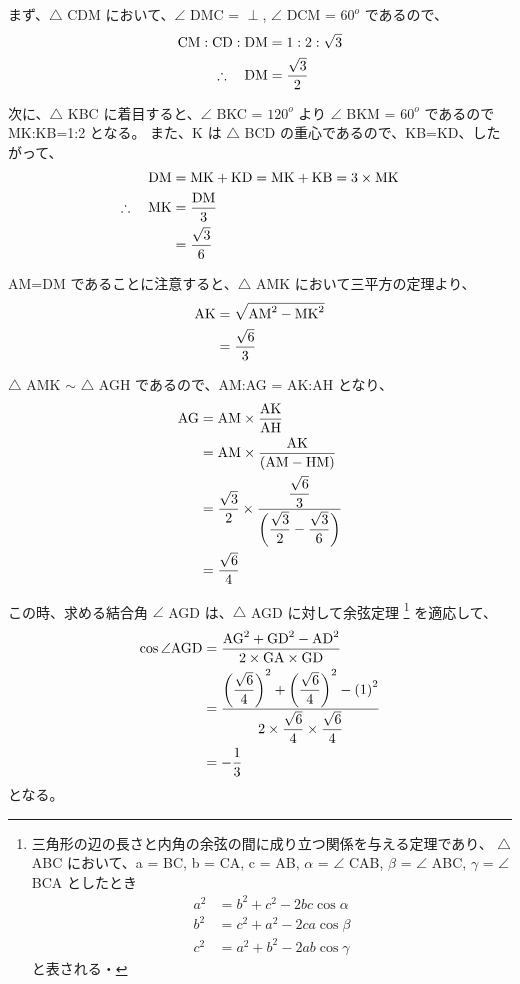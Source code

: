 \documentclass[11pt]{jsarticle}
\begin{document}
\begin{appendix}
まず、$\bigtriangleup$ CDM において、$\angle$ DMC = $\perp$, $\angle$ DCM = $60^o$ であるので、
\begin{align*}
{\rm CM} : {\rm CD} : {\rm DM} &= 1: 2 : \sqrt{3} \\
\therefore \quad {\rm DM} &= \dfrac{\sqrt{3}}{2}
\end{align*}

次に、$\bigtriangleup$ KBC に着目すると、$\angle$ BKC = $120^o$ より $\angle$ BKM = $60^o$ であるので MK:KB=1:2 となる。
また、K は $\bigtriangleup$ BCD の重心であるので、KB=KD、したがって、
\begin{align*}
{\rm DM} &= {\rm MK} + {\rm KD} = {\rm MK} + {\rm KB} = 3 \times {\rm MK} \\
\therefore \quad {\rm MK} 
	&=\dfrac{ {\rm DM} }{3} \\
	&=\dfrac{\sqrt{3}}{6}
\end{align*}

AM=DM であることに注意すると、$\bigtriangleup$ AMK において三平方の定理より、
\begin{align*}
{\rm AK} 
	&= \sqrt{ {\rm AM}^2 - {\rm MK}^2 } \\
	&= \dfrac{\sqrt{6}}{3}
\end{align*}

$\bigtriangleup$ AMK $\sim$ $\bigtriangleup$ AGH であるので、AM:AG = AK:AH となり、
\begin{align*}
{\rm AG} 
	&= { {\rm AM} } \times \dfrac{ {\rm AK} }{ {\rm AH} } \\
	&= { {\rm AM} } \times \dfrac{ {\rm AK} }{ ({\rm AM} - {\rm HM}) } \\
	&= \dfrac{\sqrt{3}}{2} \times \dfrac{ \dfrac{\sqrt{6}}{3} }{ \left( \dfrac{\sqrt{3}}{2} - \dfrac{\sqrt{3}}{6} \right) } \\
	&= \dfrac{ \sqrt{6} }{ 4 }
\end{align*}

この時、求める結合角 $\angle$ AGD は、$\bigtriangleup$ AGD に対して余弦定理
\footnote
{
三角形の辺の長さと内角の余弦の間に成り立つ関係を与える定理であり、
$\bigtriangleup$ ABC において、a = BC, b = CA, c = AB, $\alpha$ = $\angle$ CAB, $\beta$ = $\angle$ ABC, $\gamma$ = $\angle$ BCA としたとき
\begin{align*}
a^2 &= b^2 + c^2 − 2 bc \cos \alpha \\
b^2 &= c^2 + a^2 − 2 ca \cos \beta \\
c^2 &= a^2 + b^2 − 2 ab \cos \gamma
\end{align*}
と表される・
}
を適応して、
\begin{align*}
\cos \angle {\rm AGD} 
	&= \dfrac{ {\rm AG}^2 + {\rm GD}^2 - {\rm AD}^2 }{ 2 \times {\rm GA} \times {\rm GD} } \\
	&= \dfrac{ \left( \dfrac{ \sqrt{6} }{ 4 } \right)^2 + \left( \dfrac{ \sqrt{6} }{ 4 } \right)^2 - \left( 1 \right)^2 }{ 2 \times \dfrac{ \sqrt{6} }{ 4 } \times \dfrac{ \sqrt{6} }{ 4 } } \\
	&= -\dfrac{ 1 }{ 3 }
\end{align*}
となる。


\end{appendix}
\end{document}

